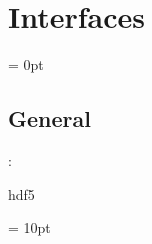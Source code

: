 
\section{Interfaces} 


\parskip = 0pt

\vspace{3mm} \subsection*{General}

: 

hdf5
\vspace{2mm}

\vspace{5mm}\parskip = 10pt 
